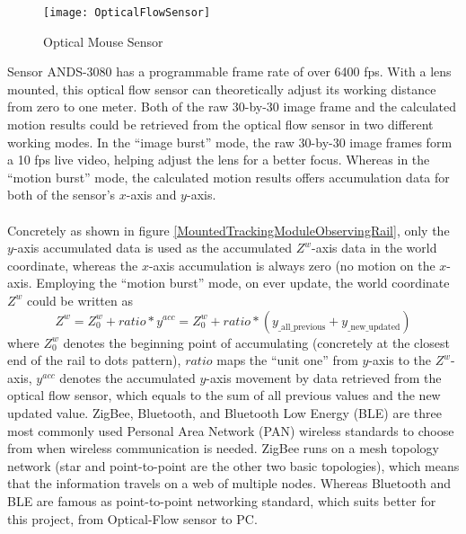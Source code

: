 %
\begin{figure}[h]
\centering
\texttt{[image: OpticalFlowSensor]}
\caption{Optical Mouse Sensor}
\label{OpticalFlowSensor}
\end{figure}%
%
%
Sensor ANDS-3080 has a programmable frame rate of over 6400 fps. With a lens mounted, this optical flow sensor can theoretically adjust its working distance from zero to one meter. Both of the raw 30-by-30 image frame and the calculated motion results could be retrieved from the optical flow sensor in two different working modes. In the \enquote{image burst} mode, the raw 30-by-30 image frames form a 10 fps live video, helping adjust the lens for a better focus. Whereas in the \enquote{motion burst} mode, the calculated motion results offers accumulation data for both of the sensor's \(x\)-axis and \(y\)-axis.
\\\\%
Concretely as shown in figure \ref{MountedTrackingModuleObservingRail}, only the \(y\)-axis accumulated data is used as the accumulated \(Z^w\)-axis data in the world coordinate, whereas the \(x\)-axis accumulation is always zero (no motion on the \(x\)-axis. Employing the \enquote{motion burst} mode, on ever update, the world coordinate \(Z^w\) could be written as%
%
\begin{equation}
%
Z^w = Z^w_0 + ratio*y^{acc} = Z^w_0 + ratio*(y_{\text{\_all\_previous}} + y_{\text{\_new\_updated}})
%
\end{equation}
%
where \(Z^w_0\) denotes the beginning point of accumulating (concretely at the closest end of the rail to dots pattern), \(ratio\) maps the \enquote{unit one} from \(y\)-axis to the \(Z^w\)-axis, \(y^{acc}\) denotes the accumulated \(y\)-axis movement by data retrieved from the optical flow sensor, which equals to the sum of all previous values and the new updated value.
%
%
ZigBee, Bluetooth, and Bluetooth Low Energy (BLE) are three most commonly used Personal Area Network (PAN) wireless standards to choose from when wireless communication is needed. ZigBee runs on a mesh topology network (star and point-to-point are the other two basic topologies), which means that the information travels on a web of multiple nodes. Whereas Bluetooth and BLE are famous as point-to-point networking standard, which suits better for this project, from Optical-Flow sensor to PC.
